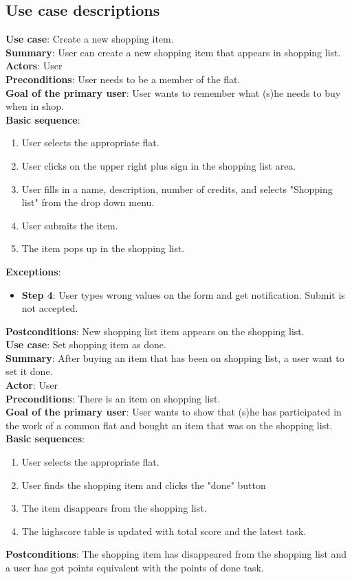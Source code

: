\documentclass{sig-alt-release2}
\begin{document}
\subsection{Use case descriptions}
\noindent
\textbf{Use case}: Create a new shopping item.\\
\textbf{Summary}: User can create a new shopping item that appears in shopping list.\\
\textbf{Actors}: User \\
\textbf{Preconditions}: User needs to be a member of the flat. \\
\textbf{Goal of the primary user}: User wants to remember what (s)he needs to buy when in shop. \\
\textbf{Basic sequence}:
\begin{enumerate}
\item User selects the appropriate flat.
\item User clicks on the upper right plus sign in the shopping list area. 
\item User fills in a name, description, number of credits, and selects "Shopping list" from the drop down menu. 
\item User submits the item.
\item The item pops up in the shopping list.
\end{enumerate}
\textbf{Exceptions}:
\begin{itemize}
\item \textbf{Step 4}: User types wrong values on the form and get notification. Submit is not accepted.
\end{itemize}
\textbf{Postconditions}: New shopping list item appears on the shopping list. \\

\noindent
\textbf{Use case}: Set shopping item as done. \\
\textbf{Summary}: After buying an item that has been on shopping list, a user want to set it done. \\
\textbf{Actor}: User \\
\textbf{Preconditions}: There is an item on shopping list. \\
\textbf{Goal of the primary user}: User wants to show that (s)he has participated in the work of a common flat and bought an item that was on the shopping list. \\
\textbf{Basic sequences}:
\begin{enumerate}
\item User selects the appropriate flat.
\item User finds the shopping item and clicks the "done" button
\item The item disappears from the shopping list.
\item The highscore table is updated with total score and the latest task.
\end{enumerate}
\textbf{Postconditions}: The shopping item has disappeared from the shopping list and a user has got points equivalent with the points of done task. \\
\end{document}
